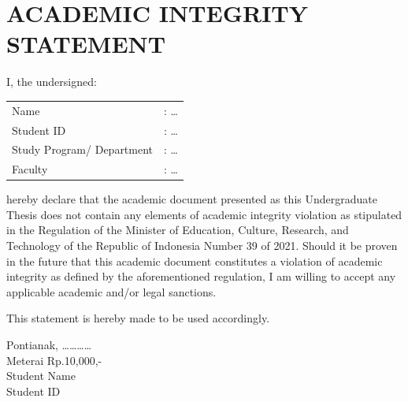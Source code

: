 \chapter*{ACADEMIC INTEGRITY STATEMENT}
\thispagestyle{empty}
\noindent I, the undersigned: \\
\begin{tabular}{@{}ll}
Name & : \dots \\
Student ID & : \dots \\
Study Program/ Department & : \dots \\
Faculty & : \dots \\
\end{tabular}

\vspace{0.5cm}
\noindent hereby declare that the academic document presented as this Undergraduate Thesis does not contain any elements of academic integrity violation as stipulated in the Regulation of the Minister of Education, Culture, Research, and Technology of the Republic of Indonesia Number 39 of 2021. Should it be proven in the future that this academic document constitutes a violation of academic integrity as defined by the aforementioned regulation, I am willing to accept any applicable academic and/or legal sanctions.

\vspace{0.5cm}
\noindent This statement is hereby made to be used accordingly.

\vspace{1cm}
\begin{flushright}
\begin{minipage}{5cm}
\begin{singlespace}
Pontianak, \dots\dots\dots\dots \\[1.5cm]
Meterai Rp.10,000,- \\
Student Name \\
Student ID
\end{singlespace}
\end{minipage}
\end{flushright}
